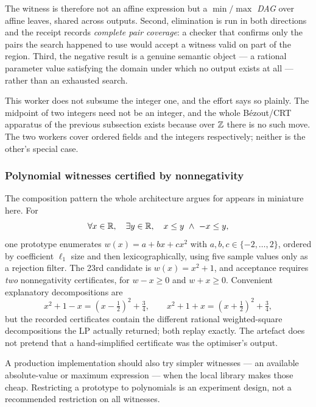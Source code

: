 The witness is therefore not an affine expression but a \emph{$\min/\max$ DAG}
over affine leaves, shared across outputs. Second, elimination is run in both
directions and the receipt records \emph{complete pair coverage}: a checker
that confirms only the pairs the search happened to use would accept a witness
valid on part of the region. Third, the negative result is a genuine semantic
object --- a rational parameter value satisfying the domain under which no
output exists at all --- rather than an exhausted search.

\begin{remark}
This worker does not subsume the integer one, and the effort says so plainly.
The midpoint of two integers need not be an integer, and the whole
B\'ezout/CRT apparatus of the previous subsection exists because over $\mathbb{Z}$
there is no such move. The two workers cover ordered fields and the integers
respectively; neither is the other's special case.
\end{remark}
\subsubsection*{Polynomial witnesses certified by nonnegativity}

The composition pattern the whole architecture argues for appears in miniature
here. For
\[
 \forall x\in\mathbb{R},\quad \exists y\in\mathbb{R},\quad x\le y\ \wedge\ -x\le y,
\]
one prototype enumerates $w(x)=a+bx+cx^2$ with $a,b,c\in\{-2,\ldots,2\}$,
ordered by coefficient $\ell_1$ size and then lexicographically, using five
sample values only as a rejection filter. The 23rd candidate is $w(x)=x^2+1$,
and acceptance requires \emph{two} nonnegativity certificates, for $w-x\ge0$ and
$w+x\ge0$. Convenient explanatory decompositions are
\[
 x^2+1-x=\left(x-\tfrac12\right)^2+\tfrac34,\qquad
 x^2+1+x=\left(x+\tfrac12\right)^2+\tfrac34,
\]
but the recorded certificates contain the different rational weighted-square
decompositions the LP actually returned; both replay exactly. The artefact does
not pretend that a hand-simplified certificate was the optimiser's output.

A production implementation should also try simpler witnesses --- an available
absolute-value or maximum expression --- when the local library makes those
cheap. Restricting a prototype to polynomials is an experiment design, not a
recommended restriction on all \forge{} witnesses.

